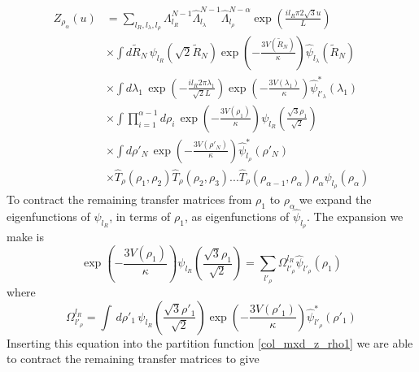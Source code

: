 \begin{align}\label{col_mxd_z_rho2}
Z_{\rho_\alpha}\left(u\right) &=\sum_{l_R,l_\lambda,l_\rho}\Lambda_{l_R}^{N-1}\hat{\Lambda}_{l_\lambda}^{N-1}\hat{\Lambda}_{l_\rho}^{N-\alpha}\exp\left(\frac{il_{R}\pi 2\sqrt{3}u}{L}\right)\nonumber\\
&\times\int d\tilde{R}_N\,\psi_{l_R}\left(\sqrt{2}\tilde{R}_{N}\right)\exp\left(-\frac{3V\left(\tilde{R}_N\right)}{\kappa}\right)\hat{\psi}_{l_\lambda}\left(\tilde{R}_N\right)\nonumber\\
&\times\int d\lambda_{1}\,\exp\left(-\frac{il_{R}2\pi\lambda_1}{\sqrt{2}L} \right)\exp\left(-\frac{3V(\lambda_{1})}{\kappa}\right)\hat{\psi}^{*}_{l'_\lambda}\left(\lambda_{1}\right)\nonumber\\
&\times\int\prod^{\alpha-1}_{i=1}d\rho_i\, \exp\left(-\frac{3V(\rho_{1})}{\kappa}\right)\psi_{l_R}\left( \frac{\sqrt{3}\rho_1}{\sqrt{2}}\right)\nonumber\\
&\times\int d\rho'_N\,\exp\left(-\frac{3V(\rho'_{N})}{\kappa}\right)\hat{\psi}^{*}_{l_\rho}\left(\rho'_{N}\right)\nonumber\\
&\times\hat{T}_{\rho}(\rho_1,\rho_2)\hat{T}_{\rho}(\rho_2,\rho_3)...\hat{T}_{\rho}(\rho_{\alpha-1},\rho_{\alpha})\rho_{\alpha}\hat{\psi}_{l_\rho}\left(\rho_{\alpha}\right)
\end{align}
%
To contract the remaining transfer matrices from $\rho_{1}$ to $\rho_{\alpha}$ we expand the eigenfunctions of $\psi_{l_R}$, in terms of $\rho_{1}$, as eigenfunctions of $\hat{\psi}_{l_\rho}$. The expansion we make is
% 
\begin{equation}
\exp\left(-\frac{3V(\rho_{1})}{\kappa}\right)\psi_{l_R}\left( \frac{\sqrt{3}\rho_1}{\sqrt{2}}\right)=\sum_{l'_{\rho}}\Omega^{l_{R}}_{l'_{\rho}}\hat{\psi}_{l'_{\rho}}\left(\rho_{1}\right)
\end{equation}
%
where
%
\begin{equation}
\Omega^{l_{R}}_{l'_{\rho}}=\int\,d\rho'_{1}\,\psi_{l_R}\left( \frac{\sqrt{3}\rho'_1}{\sqrt{2}}\right)\exp\left(-\frac{3V(\rho'_{1})}{\kappa}\right)\hat{\psi}^{*}_{l'_{\rho}}\left(\rho'_{1}\right)
\end{equation}
%
Inserting this equation into the partition function \eqref{col_mxd_z_rho1} we are able to contract the remaining transfer matrices to give
%
